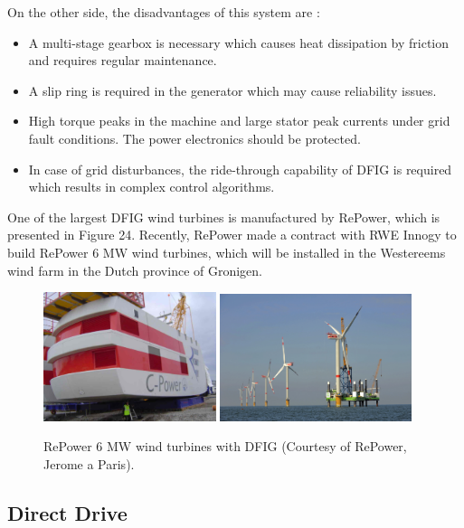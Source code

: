 \documentclass[a4paper, 11pt]{article} %
\begin{document}
On the other side, the disadvantages of this system are \cite{Li2008a}:
\begin{itemize}
	\item A multi-stage gearbox is necessary which causes heat dissipation by friction and requires regular maintenance.
	\item A slip ring is required in the generator which may cause reliability issues.
	\item High torque peaks in the machine and large stator peak currents under grid fault conditions. The power electronics should be protected.
	\item In case of grid disturbances, the ride-through capability of DFIG is required which results in complex control algorithms.
\end{itemize}

One of the largest DFIG wind turbines is manufactured by RePower, which is presented in Figure 24. Recently, RePower made a contract with RWE Innogy to build RePower 6 MW wind turbines, which will be installed in the Westereems wind farm in the Dutch province of Gronigen.

\begin{figure}[]
  \centering
  \includegraphics[width=0.45\textwidth]{repower_nacelle}
  \hfill
    \includegraphics[width=0.5\textwidth]{repower_farm}
\caption{RePower 6 MW wind turbines with DFIG (Courtesy of RePower, Jerome a Paris).}
  \label{offshore-turbine-size}
\end{figure}

\subsection{Direct Drive}
\end{document}
